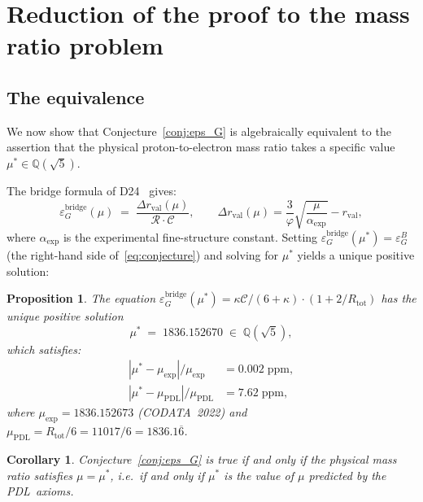 \documentclass[11pt,a4paper]{article}
\newtheorem{proposition}[theorem]{Proposition}
\newtheorem{corollary}[theorem]{Corollary}
\theoremstyle{definition}
\newcommand{\PDL}{\textnormal{PDL}}
\newcommand{\Rtot}{R_{\mathrm{tot}}}
\newcommand{\rval}{r_{\mathrm{val}}}
\newcommand{\epsg}{\varepsilon_G}
\newcommand{\calR}{\mathcal{R}}
\newcommand{\calC}{\mathcal{C}}
\newcommand{\vp}{\varphi}
\newcommand{\kap}{\kappa}
\newcommand{\drval}{\Delta r_{\mathrm{val}}}
\newcommand{\muPDL}{\mu_{\mathrm{PDL}}}
\newcommand{\muexp}{\mu_{\mathrm{exp}}}
\newcommand{\mustar}{\mu^*}
\begin{document}
\section{Reduction of the proof to the mass ratio problem}
\label{sec:proof_reduction}

\subsection{The equivalence}
\label{subsec:equivalence}

We now show that Conjecture~\ref{conj:eps_G} is algebraically equivalent to the assertion that the physical proton-to-electron mass ratio takes a specific value $\mustar \in \mathbb{Q}(\sqrt{5})$.

The bridge formula of D24~\cite{Bridge_PDL_2026} gives:
\begin{equation}
\label{eq:bridge_eps}
\epsg^{\mathrm{bridge}}(\mu) \;=\; \frac{\drval(\mu)}{\calR\cdot\calC}, \qquad \drval(\mu) = \frac{3}{\vp}\sqrt{\frac{\mu}{\alpha_{\exp}}} - \rval,
\end{equation}
where $\alpha_{\exp}$ is the experimental fine-structure constant. Setting $\epsg^{\mathrm{bridge}}(\mustar) = \epsg^B$ (the right-hand side of~\eqref{eq:conjecture}) and solving for $\mustar$ yields a unique positive solution:

\begin{proposition}
\label{prop:mu_star}
The equation $\epsg^{\mathrm{bridge}}(\mustar) = \kap\calC/(6+\kap)\cdot(1+2/\Rtot)$ has the unique positive solution
\begin{equation}
\label{eq:mu_star}
\mustar \;=\; 1836.152670 \;\in\; \mathbb{Q}(\sqrt{5}),
\end{equation}
which satisfies:
\begin{align}
|\mustar - \muexp| / \muexp &= 0.002 \;\mathrm{ppm}, \label{eq:mu_star_exp}\\
|\mustar - \muPDL| / \muPDL &= 7.62 \;\mathrm{ppm}, \label{eq:mu_star_PDL}
\end{align}
where $\muexp = 1836.152673$ (CODATA~2022) and $\muPDL = \Rtot/6 = 11017/6 = 1836.1\overline{6}$.
\end{proposition}

\begin{corollary}
\label{cor:equivalence}
Conjecture~\ref{conj:eps_G} is true if and only if the physical mass ratio satisfies $\mu = \mustar$, i.e.\ if and only if $\mustar$ is the value of $\mu$ predicted by the \PDL\ axioms.
\end{corollary}
\end{document}
